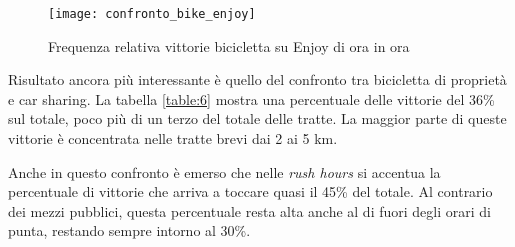 \begin{figure}[H]
	\texttt{[image: confronto\_bike\_enjoy]}
	\caption{Frequenza relativa vittorie bicicletta su Enjoy di ora in ora}
	\label{image:11}
\end{figure}

Risultato ancora più interessante è quello del confronto tra bicicletta di proprietà e car sharing. La tabella \ref{table:6} mostra una percentuale delle vittorie del 36\% sul totale, poco più di un terzo del totale delle tratte. La maggior parte di queste vittorie è concentrata nelle tratte brevi dai 2 ai 5 km.

Anche in questo confronto è emerso che nelle \textit{rush hours} si accentua la percentuale di vittorie che arriva a toccare quasi il 45\% del totale. Al contrario dei mezzi pubblici, questa percentuale resta alta anche al di fuori degli orari di punta, restando sempre intorno al 30\%.


